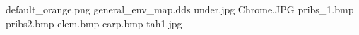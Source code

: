 default_orange.png
general_env_map.dds
under.jpg
Chrome.JPG
pribs_1.bmp
pribs2.bmp
elem.bmp
carp.bmp
tah1.jpg
